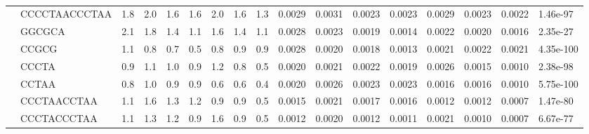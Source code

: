 \begin{landscape}
\begin{samepage}
\begin{table}[h!]
\begin{tabular}{lllllllllllllllll}
\textbf{}    &  CCCCTAACCCTAA &  1.8  &  2.0  &  1.6  &  1.6  &  2.0  &  1.6  &  1.3  &  0.0029 &  0.0031 &  0.0023 &  0.0023 &  0.0029 &  0.0023 &  0.0022 &   1.46e-97 \\
\textbf{}    &         GGCGCA &  2.1  &  1.8  &  1.4  &  1.1  &  1.6  &  1.4  &  1.1  &  0.0028 &  0.0023 &  0.0019 &  0.0014 &  0.0022 &  0.0020 &  0.0016 &   2.35e-27 \\
\textbf{}    &          CCGCG &  1.1  &  0.8  &  0.7  &  0.5  &  0.8  &  0.9  &  0.9  &  0.0028 &  0.0020 &  0.0018 &  0.0013 &  0.0021 &  0.0022 &  0.0021 &  4.35e-100 \\
\textbf{}    &          CCCTA &  0.9  &  1.1  &  1.0  &  0.9  &  1.2  &  0.8  &  0.5  &  0.0020 &  0.0021 &  0.0022 &  0.0019 &  0.0026 &  0.0015 &  0.0010 &   2.38e-98 \\
\textbf{}    &          CCTAA &  0.8  &  1.0  &  0.9  &  0.9  &  0.6  &  0.6  &  0.4  &  0.0020 &  0.0026 &  0.0023 &  0.0023 &  0.0016 &  0.0016 &  0.0010 &  5.75e-100 \\
\textbf{}    &    CCCTAACCTAA &  1.1  &  1.6  &  1.3  &  1.2  &  0.9  &  0.9  &  0.5  &  0.0015 &  0.0021 &  0.0017 &  0.0016 &  0.0012 &  0.0012 &  0.0007 &   1.47e-80 \\
\textbf{}    &    CCCTACCCTAA &  1.1  &  1.3  &  1.2  &  0.9  &  1.6  &  0.9  &  0.5  &  0.0012 &  0.0020 &  0.0012 &  0.0011 &  0.0021 &  0.0010 &  0.0007 &   6.67e-77 \\
\hline
\end{tabular}
\caption{}
\label{}
\end{table}
\end{samepage}
\end{landscape}

